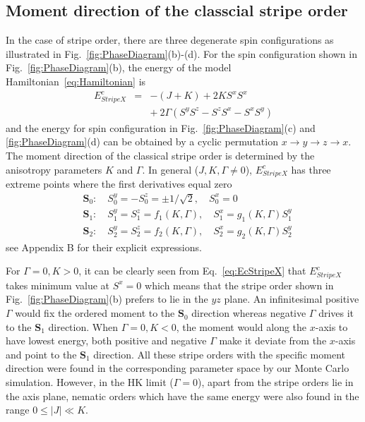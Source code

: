 \documentclass[aps,prb,reprint,amsfonts,amsmath,amssymb,showpacs,groupedaddress,superscriptaddress]{revtex4-1}
\begin{document}
\subsection{\label{sec:SectionIIIB}Moment direction of the classcial stripe order}
In the case of stripe order, there are three degenerate spin configurations as illustrated in Fig.~\ref{fig:PhaseDiagram}(b)-(d). For the spin configuration shown in Fig.~\ref{fig:PhaseDiagram}(b), the energy of the model Hamiltonian~\eqref{eq:Hamiltonian} is
\begin{eqnarray}
    E_{StripeX}^{c} & = & -(J + K) + 2 K S^x S^x \nonumber \\
        & & +\: 2 \Gamma (S^y S^z - S^z S^x - S^x S^y) \label{eq:EcStripeX}
\end{eqnarray}
and the energy for spin configuration in Fig.~\ref{fig:PhaseDiagram}(c) and \ref{fig:PhaseDiagram}(d) can be obtained by a cyclic permutation $x \rightarrow y \rightarrow z \rightarrow x$. The moment direction of the classical stripe order is determined by the anisotropy parameters $K$ and $\Gamma$. In general ($J,K,\Gamma \neq 0$), $E_{StripeX}^{c}$ has three extreme points where the first derivatives equal zero
\begin{subequations}
    \label{eq:whole}
    \begin{align}
        & \mathbf{S}_0: \quad S_{0}^{y}=-S_{0}^{z} = \pm1/\sqrt{2}, \quad S_{0}^{x} = 0 \label{eq:S0} \\
        & \mathbf{S}_1: \quad S_{1}^{y}=S_{1}^{z} = f_{1}(K, \Gamma), \quad S_{1}^{x} = g_{1}(K, \Gamma) S_{1}^{y} \label{eq:S1} \\
        & \mathbf{S}_2: \quad S_{2}^{y}=S_{2}^{z} = f_{2}(K, \Gamma), \quad S_{2}^{x} = g_{2}(K, \Gamma) S_{2}^{y} \label{eq:S2}
    \end{align}
\end{subequations}
see Appendix B for their explicit expressions.

For $\Gamma=0, K>0$, it can be clearly seen from Eq.~\eqref{eq:EcStripeX} that $E_{StripeX}^{c}$ takes minimum value at $S^x = 0$ which means that the stripe order shown in Fig.~\ref{fig:PhaseDiagram}(b) prefers to lie in the $yz$ plane. An infinitesimal positive $\Gamma$ would fix the ordered moment to the $\mathbf{S}_0$ direction whereas negative $\Gamma$ drives it to the $\mathbf{S}_1$ direction. When $\Gamma=0, K<0$, the moment would along the $x$-axis to have lowest energy, both positive and negative $\Gamma$ make it deviate from the $x$-axis and point to the $\mathbf{S}_1$ direction. All these stripe orders with the specific moment direction were found in the corresponding parameter space by our Monte Carlo simulation. However, in the HK limit ($\Gamma=0$), apart from the stripe orders lie in the axis plane, nematic orders which have the same energy were also found in the range $0 \leq |J| \ll K$.
\end{document}
